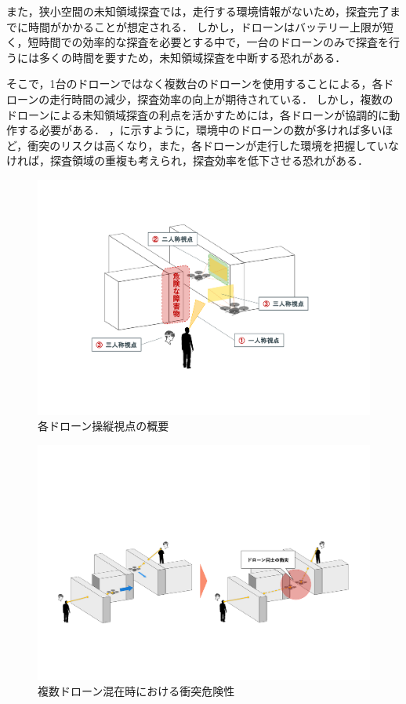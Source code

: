 \documentclass[a4paper,11pt]{ujreport}
\begin{document}
\par
また，狭小空間の未知領域探査では，走行する環境情報がないため，探査完了までに時間がかかることが想定される\cite{book-multi01}\cite{book-multi02}．
しかし，ドローンはバッテリー上限が短く，短時間での効率的な探査を必要とする中で\cite{article-drone14}\cite{article-drone15}\cite{article-drone16}，一台のドローンのみで探査を行うには多くの時間を要すため，未知領域探査を中断する恐れがある．

そこで，1台のドローンではなく複数台のドローンを使用することによる，各ドローンの走行時間の減少，探査効率の向上が期待されている．
しかし，複数のドローンによる未知領域探査の利点を活かすためには，各ドローンが協調的に動作する必要がある．
，に示すように，環境中のドローンの数が多ければ多いほど，衝突のリスクは高くなり，また，各ドローンが走行した環境を把握していなければ，探査領域の重複も考えられ，探査効率を低下させる恐れがある．

\begin{figure}[!tb]
  \centering
  \includegraphics[width=\linewidth]{img/01_viewpoint.pdf}
  \caption{各ドローン操縦視点の概要}
  \label{fig:01_viewpoint}
\end{figure}

\begin{figure}[!tb]
  \centering
  \includegraphics[width=\linewidth]{img/01_collision.pdf}
  \caption{複数ドローン混在時における衝突危険性}
  \label{fig:01_collision}
\end{figure}
\end{document}
